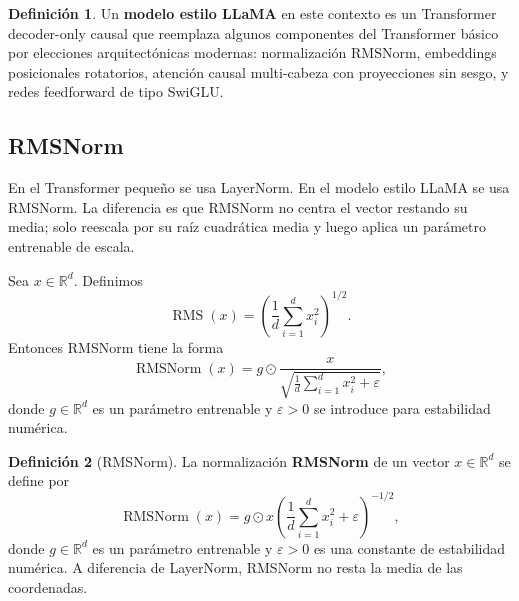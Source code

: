 \documentclass[11pt]{report}
\newenvironment{tcolorbox}[1][]{\par\medskip\noindent\ignorespaces}{\par\medskip}
\theoremstyle{definition}
\newtheorem{definicion}{Definición}[section]
\theoremstyle{plain}
\numberwithin{equation}{section}
\newcommand{\R}{\mathbb{R}}
\newcommand{\RMSN}{\operatorname{RMSNorm}}
\begin{document}
\begin{tcolorbox}[colback=blue!8, colframe=blue!8, boxrule=0pt]
\begin{definicion}
Un \textbf{modelo estilo LLaMA} en este contexto es un Transformer decoder-only causal que reemplaza algunos componentes del Transformer básico por elecciones arquitectónicas modernas: normalización RMSNorm, embeddings posicionales rotatorios, atención causal multi-cabeza con proyecciones sin sesgo, y redes feedforward de tipo SwiGLU.
\end{definicion}
\end{tcolorbox}

\subsection{RMSNorm}

En el Transformer pequeño se usa LayerNorm. En el modelo estilo LLaMA se usa RMSNorm. La diferencia es que RMSNorm no centra el vector restando su media; solo reescala por su raíz cuadrática media y luego aplica un parámetro entrenable de escala.

Sea \(x\in\mathbb{R}^d\). Definimos
\begin{equation*}
    \operatorname{RMS}(x)
    =
    \left(
        \frac{1}{d}
        \sum_{i=1}^{d}x_i^2
    \right)^{1/2}.
\end{equation*}
Entonces RMSNorm tiene la forma
\begin{equation*}
    \operatorname{RMSNorm}(x)
    =
    g\odot
    \frac{x}{\sqrt{\frac{1}{d}\sum_{i=1}^{d}x_i^2+\varepsilon}},
\end{equation*}
donde \(g\in\mathbb{R}^d\) es un parámetro entrenable y \(\varepsilon>0\) se introduce para estabilidad numérica.

\begin{tcolorbox}[colback=blue!8, colframe=blue!8, boxrule=0pt]
\begin{definicion}[RMSNorm]
La normalización \textbf{RMSNorm} de un vector \(x\in\R^d\) se define por
\begin{equation*}
    \RMSN(x)
    =
    g\odot x
    \left(
        \frac{1}{d}\sum_{i=1}^{d}x_i^2+\varepsilon
    \right)^{-1/2},
\end{equation*}
donde \(g\in\R^d\) es un parámetro entrenable y \(\varepsilon>0\) es una constante de estabilidad numérica. A diferencia de LayerNorm, RMSNorm no resta la media de las coordenadas.
\end{definicion}
\end{tcolorbox}
\end{document}
